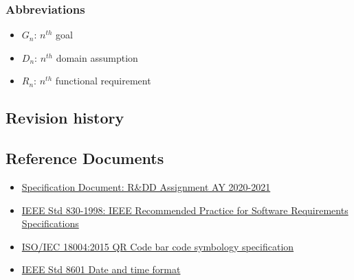 \subsubsection{Abbreviations}
\begin{itemize}
    \item \textbf{$G_n$}: $n^{th}$ goal
    \item \textbf{$D_n$}: $n^{th}$ domain assumption
    \item \textbf{$R_n$}: $n^{th}$ functional requirement
\end{itemize}
\subsection{Revision history}


\subsection{Reference Documents}
\begin{itemize}
    \item \href{https://beep.metid.polimi.it/documents/121843524/23d1869d-ab17-4e36-979e-f1ccbc59be24}{Specification Document: R\&DD Assignment AY 2020-2021}
    \item \href{https://standards.ieee.org/standard/29148-2011.html}{IEEE Std 830-1998: IEEE Recommended Practice for Software Requirements Specifications}
    \item \href{https://www.iso.org/standard/62021.html}{ISO/IEC 18004:2015 QR Code bar code symbology specification}
    \item \href{https://www.iso.org/iso-8601-date-and-time-format.html}{IEEE Std 8601 Date and time format}
\end{itemize}


